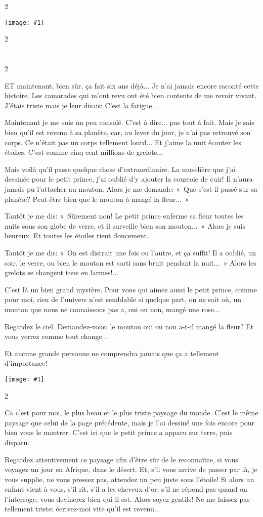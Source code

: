 \documentclass{report}
\newcommand{\parachapter}[2][]{\end{paracol}\chapter[#1]{#2}\begin{paracol}{2}}
\newcommand{\incpic}[1]{%
\end{paracol}
\begin{center}
    \texttt{[image: \#1]}
\end{center}
\begin{paracol}{2}}
\begin{document}
\begin{paracol}{2}
\incpic{pic/image45.jpeg}

\parachapter{} %

ET maintenant, bien sûr, ça fait six ans déjà... Je n'ai jamais encore raconté cette histoire. Les camarades qui m'ont revu ont été bien contents de me revoir vivant. J'étais triste mais je leur disais: C'est la fatigue...

Maintenant je me suis un peu consolé. C'est à dire... pas tout à fait. Mais je sais bien qu'il est revenu à sa planète, car, au lever du jour, je n'ai pas retrouvé son corps. Ce n'était pas un corps tellement lourd... Et j'aime la nuit écouter les étoiles. C'est comme cinq cent millions de grelots...

Mais voilà qu'il passe quelque chose d'extraordinaire. La muselière que j'ai dessinée pour le petit prince, j'ai oublié d'y ajouter la courroie de cuir! Il n'aura jamais pu l'attacher au mouton. Alors je me demande: «~Que s'est-il passé sur sa planète? Peut-être bien que le mouton à mangé la fleur...~»

Tantôt je me dis: «~Sûrement non! Le petit prince enferme sa fleur toutes les nuits sous son globe de verre, et il surveille bien son mouton...~» Alors je suis heureux. Et toutes les étoiles rient doucement.

Tantôt je me dis: «~On est distrait une fois ou l'autre, et ça suffit! Il a oublié, un soir, le verre, ou bien le mouton est sorti sans bruit pendant la nuit...~» Alors les grelots se changent tous en larmes!...

C'est là un bien grand mystère. Pour vous qui aimez aussi le petit prince, comme pour moi, rien de l'univers n'est semblable si quelque part, on ne sait où, un mouton que nous ne connaissons pas a, oui ou non, mangé une rose...

Regardez le ciel. Demandez-vous: le mouton oui ou non a-t-il mangé la fleur? Et vous verrez comme tout change...

Et aucune grande personne ne comprendra jamais que ça a tellement d'importance!

\incpic{pic/image46.jpeg}

Ca c'est pour moi, le plus beau et le plus triste paysage du monde. C'est le même paysage que celui de la page précédente, mais je l'ai dessiné une fois encore pour bien vous le montrer. C'est ici que le petit prince a apparu sur terre, puis disparu.

Regardez attentivement ce paysage afin d'être sûr de le reconnaître, si vous voyagez un jour en Afrique, dans le désert. Et, s'il vous arrive de passer par là, je vous supplie, ne vous pressez pas, attendez un peu juste sous l'étoile! Si alors un enfant vient à vous, s'il rit, s'il a les cheveux d'or, s'il ne répond pas quand on l'interroge, vous devinerez bien qui il est. Alors soyez gentils! Ne me laissez pas tellement triste: écrivez-moi vite qu'il est revenu...
\end{paracol}
\end{document}
